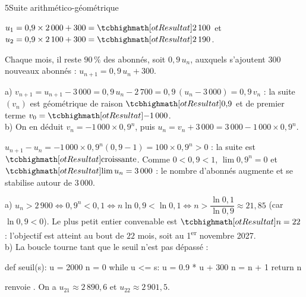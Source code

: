 \begin{corrigeBac}{5}{Suite arithmético-géométrique}
\begin{questions}
  \item $u_1=0{,}9\times2\,000+300=\res{2\,100}$ et $u_2=0{,}9\times2\,100+300=\res{2\,190}$. 
  \item Chaque mois, il reste $90\,\%$ des abonnés, soit $0{,}9\,u_n$, auxquels s'ajoutent $300$ nouveaux abonnés :
    $u_{n+1}=0{,}9\,u_n+300$. 
  \item a) $v_{n+1}=u_{n+1}-3\,000=0{,}9\,u_n-2\,700=0{,}9\,(u_n-3\,000)=0{,}9\,v_n$ : la suite $(v_n)$ est géométrique de raison
    $\res{0{,}9}$ et de premier terme $v_0=\res{-1\,000}$.\\
    b) On en déduit $v_n=-1\,000\times0{,}9^{n}$, puis $u_n=v_n+3\,000=3\,000-1\,000\times0{,}9^{n}$. 
  \item $u_{n+1}-u_n=-1\,000\times0{,}9^{n}(0{,}9-1)=100\times0{,}9^{n}>0$ : la suite est $\res{\text{croissante}}$. Comme
    $0<0{,}9<1$, $\lim0{,}9^{n}=0$ et $\res{\lim u_n=3\,000}$ : le nombre d'abonnés augmente et se stabilise autour de $3\,000$. \pts{1 pt}
  \item a) $u_n>2\,900\iff0{,}9^{n}<0{,}1\iff n\ln0{,}9<\ln0{,}1\iff n>\dfrac{\ln0{,}1}{\ln0{,}9}\approx21{,}85$ (car $\ln0{,}9<0$).
    Le plus petit entier convenable est $\res{n=22}$ : l'objectif est atteint au bout de $22$ mois, soit au
    1\textsuperscript{er} novembre 2027.\\
    b) La boucle tourne tant que le seuil n'est pas dépassé :
\begin{codecote}[0.5]
\begin{pythoncol}
def seuil(s):
    u = 2000
    n = 0
    while u <= s:
        u = 0.9 * u + 300
        n = n + 1
    return n
\end{pythoncol}
\cote
{} renvoie . On a $u_{21}\approx2\,890{,}6$ et $u_{22}\approx2\,901{,}5$.
\end{codecote}
\end{questions}
\end{corrigeBac}

